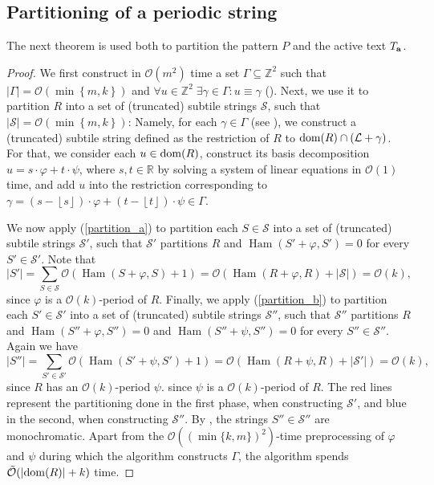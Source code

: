 \documentclass[11pt, letterpaper]{article}
\theoremstyle{plain}
\theoremstyle{definition}
\theoremstyle{remark}
\newcommand{\R}{\mathbb{R}}
\newcommand{\Z}{\mathbb{Z}}
\renewcommand{\O}{\mathcal{O}}
\newcommand{\tO}{\tilde{\mathcal{O}}}
\renewcommand{\S}{\mathcal{S}}
\renewcommand{\L}{\mathcal{L}}
\renewcommand{\phi}{\varphi}
\newcommand{\floor}[1]{\left\lfloor #1 \right\rfloor}
\newcommand{\set}[1]{\left\lbrace #1 \right\rbrace}
\DeclareMathOperator*{\Ham}{Ham}
\newcommand{\absolute}[1]{\left\lvert#1\right\rvert}
\begin{document}
\subsection{Partitioning of a periodic string}
The next theorem is used both to partition the pattern $P$ and the active text $T_\mathbf{a}$.

\tileDecomposition
\begin{proof}
We first construct in $\O(m^2)$ time a set $\Gamma \subseteq \Z^2$ such that $\absolute{\Gamma} = \O(\min\set{m, k})$ and $\forall u \in \Z^2 \; \exists \gamma \in \Gamma : u \equiv \gamma$ (). Next, we use it to partition $R$ into a set of (truncated) subtile strings $\S$, such that $\absolute{\S} = \O(\min\set{m, k})$: Namely, for each $\gamma \in \Gamma$ (see ), we construct a (truncated) subtile string defined as the restriction of $R$ to $\d{R} \cap (\L + \gamma)$. For that, we consider each $u \in \operatorname*{dom}(R)$, construct its basis decomposition $u = s\cdot \phi + t\cdot \psi$, where $s,t\in \R$ by solving a system of linear equations in $\O(1)$ time, and add $u$ into the restriction corresponding to $\gamma = (s-\floor{s}) \cdot \phi + (t-\floor{t}) \cdot \psi \in \Gamma$. 

	We now apply  (\ref{partition_a}) to partition each $S \in \S$  into a set of (truncated) subtile strings $\S'$, such that $\S'$ partitions $R$ and $\Ham(S' + \phi, S') = 0$ for every $S' \in \S'$.
	Note that
	\[ \absolute{S'} = \sum_{S \in \S} \O(\Ham(S + \phi, S) + 1) = \O(\Ham(R + \phi, R) + \absolute{\S}) = \O(k),\]
	since $\phi$ is a $\O(k)$-period of $R$.
	Finally, we apply   (\ref{partition_b}) to partition each $S' \in \S'$ into a set of (truncated) subtile strings $\S''$, such that $\S''$ partitions $R$ and $\Ham(S'' + \phi, S'') = 0$ and $\Ham(S'' + \psi, S'') = 0$ for every $S'' \in \S''$.
	Again we have
	\[ \absolute{S''} = \sum_{S' \in \S'} \O(\Ham(S' + \psi, S') + 1) = \O(\Ham(R + \psi, R) + \absolute{\S'}) = \O(k),\]
	since $R$ has an $\O(k)$-period $\psi$.
	since $\psi$ is a $\O(k)$-period of $R$.
	The red lines represent the partitioning done in the first phase, when constructing $\S'$, and blue in the second, when constructing $\S''$.
	By , the strings $S'' \in \S''$ are monochromatic.
	Apart from the $\O((\min\{k,m\})^2)$-time preprocessing of $\phi$ and $\psi$ during which the algorithm constructs $\Gamma$, the algorithm spends $\tO(\absolute{\d{R}} + k)$ time.
\end{proof}
\end{document}
